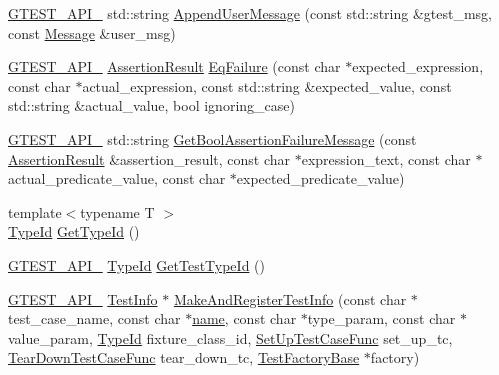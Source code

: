 \begin{DoxyCompactItemize}
\item 
\hyperlink{ts__gtest_8h_aa73be6f0ba4a7456180a94904ce17790}{G\-T\-E\-S\-T\-\_\-\-A\-P\-I\-\_\-} std\-::string \hyperlink{namespacetesting_1_1internal_af69e146a989e8d48def39a0cc59461c9}{Append\-User\-Message} (const std\-::string \&gtest\-\_\-msg, const \hyperlink{classtesting_1_1Message}{Message} \&user\-\_\-msg)
\item 
\hyperlink{ts__gtest_8h_aa73be6f0ba4a7456180a94904ce17790}{G\-T\-E\-S\-T\-\_\-\-A\-P\-I\-\_\-} \hyperlink{classtesting_1_1AssertionResult}{Assertion\-Result} \hyperlink{namespacetesting_1_1internal_ac61e2ba2cbf259fd6ee5ffd4e49c9445}{Eq\-Failure} (const char $\ast$expected\-\_\-expression, const char $\ast$actual\-\_\-expression, const std\-::string \&expected\-\_\-value, const std\-::string \&actual\-\_\-value, bool ignoring\-\_\-case)
\item 
\hyperlink{ts__gtest_8h_aa73be6f0ba4a7456180a94904ce17790}{G\-T\-E\-S\-T\-\_\-\-A\-P\-I\-\_\-} std\-::string \hyperlink{namespacetesting_1_1internal_aed8d3ad4341f8f2de53440e39c995632}{Get\-Bool\-Assertion\-Failure\-Message} (const \hyperlink{classtesting_1_1AssertionResult}{Assertion\-Result} \&assertion\-\_\-result, const char $\ast$expression\-\_\-text, const char $\ast$actual\-\_\-predicate\-\_\-value, const char $\ast$expected\-\_\-predicate\-\_\-value)
\item 
{\footnotesize template$<$typename T $>$ }\\\hyperlink{namespacetesting_1_1internal_ab1114197d3c657d8b7f8e0c5caa12d00}{Type\-Id} \hyperlink{namespacetesting_1_1internal_a6b108e56fdc68ea937ffb3759fb55ab0}{Get\-Type\-Id} ()
\item 
\hyperlink{ts__gtest_8h_aa73be6f0ba4a7456180a94904ce17790}{G\-T\-E\-S\-T\-\_\-\-A\-P\-I\-\_\-} \hyperlink{namespacetesting_1_1internal_ab1114197d3c657d8b7f8e0c5caa12d00}{Type\-Id} \hyperlink{namespacetesting_1_1internal_a1e85cf16bb95b60f879d48ba1fbfc1c9}{Get\-Test\-Type\-Id} ()
\item 
\hyperlink{ts__gtest_8h_aa73be6f0ba4a7456180a94904ce17790}{G\-T\-E\-S\-T\-\_\-\-A\-P\-I\-\_\-} \hyperlink{classtesting_1_1TestInfo}{Test\-Info} $\ast$ \hyperlink{namespacetesting_1_1internal_a7e37d3160f9d17529d3521c93e245dba}{Make\-And\-Register\-Test\-Info} (const char $\ast$test\-\_\-case\-\_\-name, const char $\ast$\hyperlink{core__c_8h_add928d8eb85ea33a25a67db3406d4887}{name}, const char $\ast$type\-\_\-param, const char $\ast$value\-\_\-param, \hyperlink{namespacetesting_1_1internal_ab1114197d3c657d8b7f8e0c5caa12d00}{Type\-Id} fixture\-\_\-class\-\_\-id, \hyperlink{namespacetesting_1_1internal_ada14d66b5460b20e09071f51b9885c8d}{Set\-Up\-Test\-Case\-Func} set\-\_\-up\-\_\-tc, \hyperlink{namespacetesting_1_1internal_aad40244621b68546f3b830696225bf9b}{Tear\-Down\-Test\-Case\-Func} tear\-\_\-down\-\_\-tc, \hyperlink{classtesting_1_1internal_1_1TestFactoryBase}{Test\-Factory\-Base} $\ast$factory)

\end{DoxyCompactItemize}
